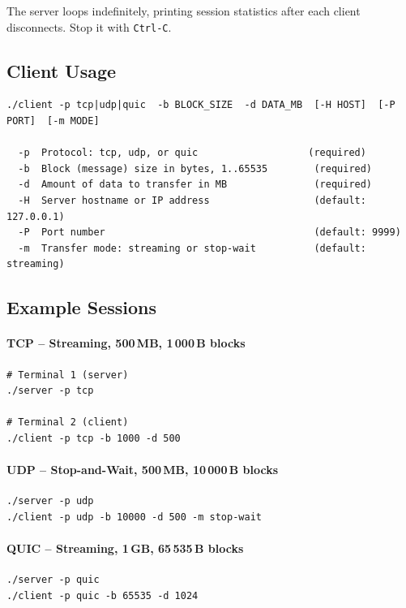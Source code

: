 \documentclass[12pt,a4paper]{article}
\begin{document}
The server loops indefinitely, printing session statistics after each
client disconnects. Stop it with \texttt{Ctrl-C}.

\subsection{Client Usage}

\begin{lstlisting}
./client -p tcp|udp|quic  -b BLOCK_SIZE  -d DATA_MB  [-H HOST]  [-P PORT]  [-m MODE]

  -p  Protocol: tcp, udp, or quic                   (required)
  -b  Block (message) size in bytes, 1..65535        (required)
  -d  Amount of data to transfer in MB               (required)
  -H  Server hostname or IP address                  (default: 127.0.0.1)
  -P  Port number                                    (default: 9999)
  -m  Transfer mode: streaming or stop-wait          (default: streaming)
\end{lstlisting}

\subsection{Example Sessions}

\paragraph{TCP – Streaming, 500\,MB, 1\,000\,B blocks}
\begin{lstlisting}
# Terminal 1 (server)
./server -p tcp

# Terminal 2 (client)
./client -p tcp -b 1000 -d 500
\end{lstlisting}

\paragraph{UDP – Stop-and-Wait, 500\,MB, 10\,000\,B blocks}
\begin{lstlisting}
./server -p udp
./client -p udp -b 10000 -d 500 -m stop-wait
\end{lstlisting}

\paragraph{QUIC – Streaming, 1\,GB, 65\,535\,B blocks}
\begin{lstlisting}
./server -p quic
./client -p quic -b 65535 -d 1024
\end{lstlisting}
\end{document}
